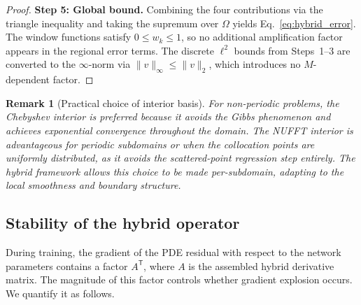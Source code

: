 \documentclass[sn-mathphys,Numbered]{sn-jnl}
\theoremstyle{thmstyleone}
\theoremstyle{thmstyletwo}
\newtheorem{remark}{Remark}
\theoremstyle{thmstylethree}
\newcommand{\T}{\mathsf{T}}
\begin{document}
\begin{proof}
\textbf{Step 5: Global bound.}
Combining the four contributions via the triangle inequality and taking the supremum over $\Omega$ yields Eq.~\eqref{eq:hybrid_error}. The window functions satisfy $0\leq w_k\leq 1$, so no additional amplification factor appears in the regional error terms. The discrete $\ell^2$ bounds from Steps~1--3 are converted to the $\infty$-norm via $\|v\|_\infty\leq\|v\|_2$, which introduces no $M$-dependent factor.
\end{proof}

\begin{remark}[Practical choice of interior basis]
For non-periodic problems, the Chebyshev interior is preferred because it avoids the Gibbs phenomenon and achieves exponential convergence throughout the domain. The NUFFT interior is advantageous for periodic subdomains or when the collocation points are uniformly distributed, as it avoids the scattered-point regression step entirely. The hybrid framework allows this choice to be made per-subdomain, adapting to the local smoothness and boundary structure.
\end{remark}

\subsection{Stability of the hybrid operator}\label{subsec:stability}

During training, the gradient of the PDE residual with respect to the network parameters contains a factor $A^\T$, where $A$ is the assembled hybrid derivative matrix. The magnitude of this factor controls whether gradient explosion occurs. We quantify it as follows.
\end{document}
